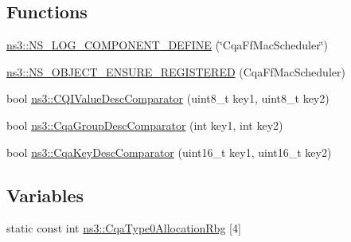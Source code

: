 \subsection*{Functions}
\begin{DoxyCompactItemize}
\item 
\hyperlink{namespacens3_abff52aa9baf5e0f74d5a4c33c783b6c0}{ns3\+::\+N\+S\+\_\+\+L\+O\+G\+\_\+\+C\+O\+M\+P\+O\+N\+E\+N\+T\+\_\+\+D\+E\+F\+I\+NE} (\char`\"{}Cqa\+Ff\+Mac\+Scheduler\char`\"{})
\item 
\hyperlink{namespacens3_a82b564cc0b367ec665af9159777e896b}{ns3\+::\+N\+S\+\_\+\+O\+B\+J\+E\+C\+T\+\_\+\+E\+N\+S\+U\+R\+E\+\_\+\+R\+E\+G\+I\+S\+T\+E\+R\+ED} (Cqa\+Ff\+Mac\+Scheduler)
\item 
bool \hyperlink{namespacens3_a683c80229574064af3aeb06091f4eab4}{ns3\+::\+C\+Q\+I\+Value\+Desc\+Comparator} (uint8\+\_\+t key1, uint8\+\_\+t key2)
\item 
bool \hyperlink{namespacens3_af9e1b18e690a42c20297a79e60269ea7}{ns3\+::\+Cqa\+Group\+Desc\+Comparator} (int key1, int key2)
\item 
bool \hyperlink{namespacens3_a087a7b768ca878db59f9ecf167d531dd}{ns3\+::\+Cqa\+Key\+Desc\+Comparator} (uint16\+\_\+t key1, uint16\+\_\+t key2)
\end{DoxyCompactItemize}
\subsection*{Variables}
\begin{DoxyCompactItemize}
\item 
static const int \hyperlink{namespacens3_acd63ca84485c877e5e3ac826c76403c8}{ns3\+::\+Cqa\+Type0\+Allocation\+Rbg} \mbox{[}4\mbox{]}
\end{DoxyCompactItemize}
